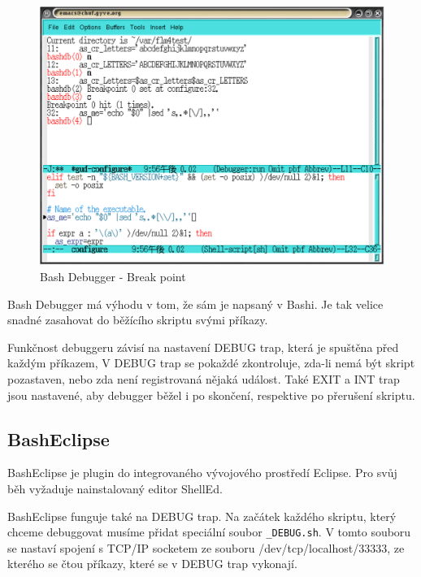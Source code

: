 \documentclass[thesis=M,czech]{FITthesis}[2012/06/26]
\begin{document}
\begin{figure}[htb]\centering
	\includegraphics[width=\textwidth]{./images/bashdb-break_invert}
	\caption{Bash Debugger - Break point}
	\label{fig:bashdb}
\end{figure}

Bash Debugger má výhodu v tom, že sám je napsaný v Bashi. Je tak velice snadné zasahovat do běžícího skriptu svými příkazy.

Funkčnost debuggeru závisí na nastavení DEBUG trap, která je spuštěna před každým příkazem, V DEBUG trap se pokaždé zkontroluje, zda-li nemá být skript pozastaven, nebo zda není registrovaná nějaká událost. Také EXIT a INT trap jsou nastavené, aby debugger běžel i po skončení, respektive po přerušení skriptu.





\subsection{BashEclipse}

BashEclipse je plugin do integrovaného vývojového prostředí Eclipse. Pro svůj běh vyžaduje nainstalovaný editor ShellEd.

BashEclipse funguje také na DEBUG trap. Na začátek každého skriptu, který chceme debuggovat musíme přidat speciální soubor \texttt{\_DEBUG.sh}. V tomto souboru se nastaví spojení s TCP/IP socketem ze souboru /dev/tcp/localhost/33333, ze kterého se čtou příkazy, které se v DEBUG trap vykonají.
\end{document}
